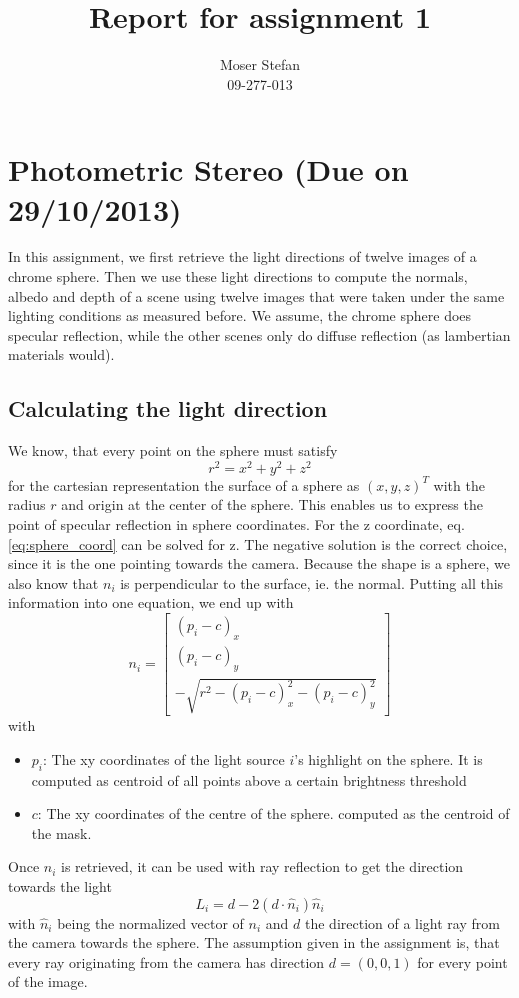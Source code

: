 \documentclass{paper}
\title{Report for assignment 1}
\author{Moser Stefan\\09-277-013}
\begin{document}
\maketitle

\section{Photometric Stereo (Due on 29/10/2013)}

In this assignment, we first retrieve the light directions of twelve images
of a chrome sphere. Then we use these light directions to compute the
normals, albedo and depth of a scene using twelve images that were taken under the
same lighting conditions as measured before. We assume, the chrome sphere does specular
 reflection, while the other scenes only do diffuse reflection (as
lambertian materials would).

\subsection{Calculating the light direction} 
We know, that every point on the sphere must satisfy
\begin{equation}
	r^2 = x^2 + y^2 + z^2
\label{eq:sphere_coord}
\end{equation}
for the cartesian representation the surface of a sphere as $(x,y,z)^T$ 
with the radius $r$ and origin at the center of the sphere. This enables
 us to express the point of specular reflection in sphere coordinates. 
For the z coordinate, eq. \ref{eq:sphere_coord} can be solved for z. 
The negative solution is the correct choice, since it is the one pointing towards the camera. 
Because the shape is a sphere, we also know that $n_i$ is perpendicular to the surface, ie. the normal. Putting
 all this information into one equation, we end up with
\begin{equation}
	n_i = 
	\left[ 
	\begin{array}{c}
	(p_i - c)_x \\
	(p_i - c)_y \\
	-\sqrt{r^2 - (p_i - c)_x^2 - (p_i - c)_y^2}
\end{array} 
\right] 
\label{eq:light_direction}
\end{equation}
with
\begin{itemize}
\item $p_i$: The xy coordinates of the light source $i$'s highlight on the sphere. It is computed as centroid of all points above a certain brightness threshold
\item $c$: The xy coordinates of the centre of the sphere. computed as the centroid of the mask.
\end{itemize} 
Once $n_i$ is retrieved, it can be used with ray reflection to get the direction towards the light
\begin{equation}
	L_i = d - 2(d\cdot \hat{n}_i)\hat{n}_i
\end{equation}
with $\hat{n}_i$ being the normalized vector of $n_i$ and $d$ the direction of a light ray from the camera towards the sphere.
The assumption given in the assignment is, 
that every ray originating from the camera has direction $d = (0,0,1)$ for every point of the image.
\end{document}
